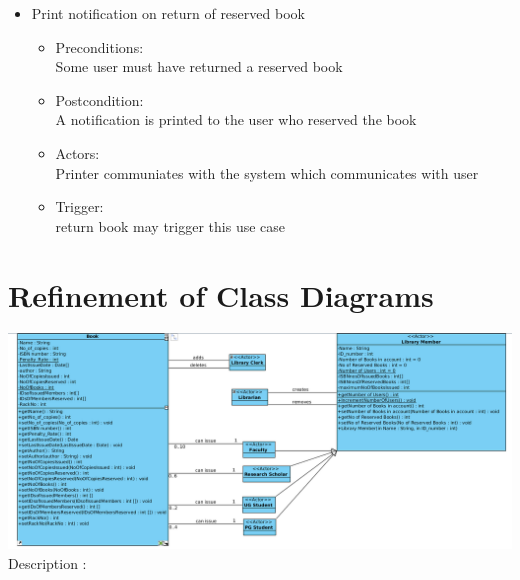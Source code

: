 \documentclass{article}
\begin{document}
\begin{enumerate}
\begin{itemize}
\item Print notification on return of reserved book\\ 
\begin{itemize}
\item Preconditions:\\ Some user must have returned a reserved book \\ 
 \item Postcondition:\\ A notification is printed to the user who reserved the book\\ 
 \item Actors: \\ Printer communiates with the system which communicates with user\\ 
 \item Trigger:\\ return book may trigger this use case\\ 
\end{itemize}

\end{itemize}
\end{enumerate}

\section{Refinement of Class Diagrams}
\includegraphics[scale=0.35]{images/classDiag.png}
\\
Description : \\
\end{document}
